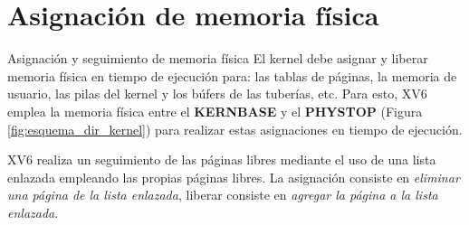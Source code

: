 \documentclass{libs/ufc_format}
\begin{document}
\section{Asignación de memoria física}
\begin{frame}{Asignación y seguimiento de memoria física}
  El kernel debe asignar y liberar memoria física en tiempo de ejecución para: las tablas de páginas, la memoria de usuario, las pilas del kernel y los búfers de las tuberías, etc. Para esto, XV6 emplea la memoria física entre el \textbf{KERNBASE} y el \textbf{PHYSTOP} (Figura \ref{fig:esquema_dir_kernel}) para realizar estas asignaciones en tiempo de ejecución. \cite{xv6_book}

  \vspace{0.3cm}

  XV6 realiza un seguimiento de las páginas libres mediante el uso de una lista enlazada empleando las propias páginas libres. La asignación consiste en \emph{eliminar una página de la lista enlazada}, liberar consiste en \emph{agregar la página a la lista enlazada}. \cite{xv6_book}
\end{frame}

\end{document}
